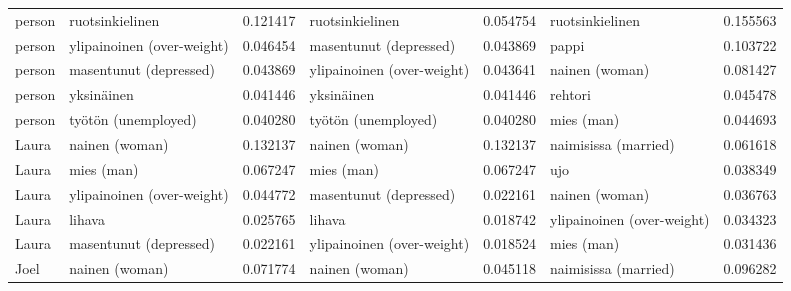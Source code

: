 \begin{tabular}{llrlrlr}
person &            ruotsinkielinen &                         0.121417 &             ruotsinkielinen &                              0.054754 &            ruotsinkielinen &                        0.155563 \\
person & ylipainoinen (over-weight) &                         0.046454 &      masentunut (depressed) &                              0.043869 &                      pappi &                        0.103722 \\
person &     masentunut (depressed) &                         0.043869 &  ylipainoinen (over-weight) &                              0.043641 &             nainen (woman) &                        0.081427 \\
person &                 yksinäinen &                         0.041446 &                  yksinäinen &                              0.041446 &                    rehtori &                        0.045478 \\
person &        työtön (unemployed) &                         0.040280 &         työtön (unemployed) &                              0.040280 &                 mies (man) &                        0.044693 \\
 Laura &             nainen (woman) &                         0.132137 &              nainen (woman) &                              0.132137 &       naimisissa (married) &                        0.061618 \\
 Laura &                 mies (man) &                         0.067247 &                  mies (man) &                              0.067247 &                        ujo &                        0.038349 \\
 Laura & ylipainoinen (over-weight) &                         0.044772 &      masentunut (depressed) &                              0.022161 &             nainen (woman) &                        0.036763 \\
 Laura &                     lihava &                         0.025765 &                      lihava &                              0.018742 & ylipainoinen (over-weight) &                        0.034323 \\
 Laura &     masentunut (depressed) &                         0.022161 &  ylipainoinen (over-weight) &                              0.018524 &                 mies (man) &                        0.031436 \\
  Joel &             nainen (woman) &                         0.071774 &              nainen (woman) &                              0.045118 &       naimisissa (married) &                        0.096282 \\

\end{tabular}
